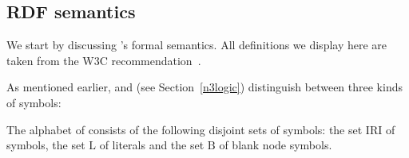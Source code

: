 \subsection{RDF semantics}
We start by discussing \rdf's formal semantics. 
All definitions we display here are taken from the W3C recommendation~\cite{RDFSemantics}.



As mentioned earlier, \rdf and \nthree (see Section~\ref{n3logic}) distinguish between three kinds of symbols:

\begin{definition}
The alphabet of \rdf consists of the following disjoint sets of symbols:
the set $\mathrm{IRI}$ of \iri symbols, the set $\mathrm{L}$ of literals and the set $\mathrm{B}$ of blank node symbols. 
\end{definition}

